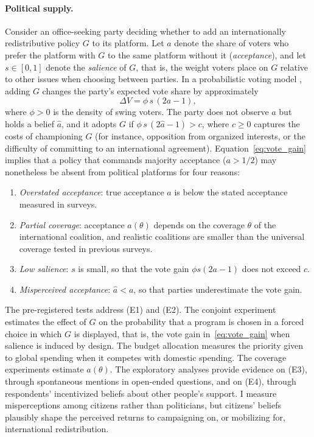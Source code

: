 \documentclass[12pt,english]{article}
\begin{document}
\paragraph{Political supply.} Consider an office-seeking party deciding whether to add an internationally redistributive policy $G$ to its platform. Let $a$ denote the share of voters who prefer the platform with $G$ to the same platform without it (\textit{acceptance}), and let $s \in [0,1]$ denote the \textit{salience} of $G$, that is, the weight voters place on $G$ relative to other issues when choosing between parties. In a probabilistic voting model \citep{lindbeck_balanced-budget_1987}, adding $G$ changes the party's expected vote share by approximately
\begin{equation}\label{eq:vote_gain}
\Delta V = \phi \, s \, (2a - 1),
\end{equation}
where $\phi > 0$ is the density of swing voters. The party does not observe $a$ but holds a belief $\hat{a}$, and it adopts $G$ if $\phi \, s \, (2\hat{a} - 1) > c$, where $c \geq 0$ captures the costs of championing $G$ (for instance, opposition from organized interests, or the difficulty of committing to an international agreement). Equation~\eqref{eq:vote_gain} implies that a policy that commands majority acceptance ($a > 1/2$) may nonetheless be absent from political platforms for four reasons:
\begin{enumerate}[label=(E\arabic*), itemsep=0pt]
  \item \textit{Overstated acceptance}: true acceptance $a$ is below the stated acceptance measured in surveys.
  \item \textit{Partial coverage}: acceptance $a(\theta)$ depends on the coverage $\theta$ of the international coalition, and realistic coalitions are smaller than the universal coverage tested in previous surveys.
  \item \textit{Low salience}: $s$ is small, so that the vote gain $\phi s (2a-1)$ does not exceed $c$.
  \item \textit{Misperceived acceptance}: $\hat{a} < a$, so that parties underestimate the vote gain.
\end{enumerate}
The pre-registered tests address (E1) and (E2). The conjoint experiment estimates the effect of $G$ on the probability that a program is chosen in a forced choice in which $G$ is displayed, that is, the vote gain in~\eqref{eq:vote_gain} when salience is induced by design. The budget allocation measures the priority given to global spending when it competes with domestic spending. The coverage experiments estimate $a(\theta)$. The exploratory analyses provide evidence on (E3), through spontaneous mentions in open-ended questions, and on (E4), through respondents' incentivized beliefs about other people's support. I measure misperceptions among citizens rather than politicians, but citizens' beliefs plausibly shape the perceived returns to campaigning on, or mobilizing for, international redistribution.
\end{document}
